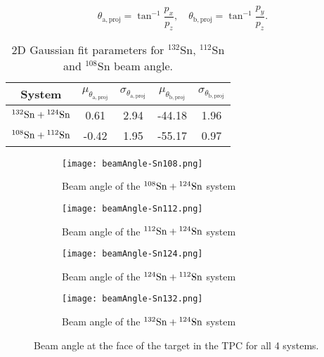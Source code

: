 
\begin{equation}
  \theta_\mathrm{a,proj}=\tan^{-1}\frac{p_x}{p_z},\quad
  \theta_\mathrm{b,proj}=\tan^{-1}\frac{p_y}{p_z}.
  \label{beamAngle}
\end{equation}





\begin{table}[!htb]
  \begin{center}
    \begin{tabular}{ccccc}
      \hline 
      System & $\mu_{\theta_\mathrm{a,proj}}$ &
      $\sigma_{\theta_\mathrm{a,proj}}$ & $\mu_{\theta_\mathrm{b,proj}}$ &
      $\sigma_{\theta_\mathrm{b,proj}}$ \\
      \hline\hline 
      ${}^{132}\mathrm{Sn} + {}^{124}\mathrm{Sn}$ & 0.61 & 2.94 & -44.18 & 1.96 \\
      ${}^{108}\mathrm{Sn} + {}^{112}\mathrm{Sn}$ & -0.42 & 1.95 & -55.17 & 0.97 \\
      \hline
    \end{tabular}
    \caption{2D Gaussian fit parameters for $^{132}$Sn, $^{112}$Sn and
      $^{108}$Sn beam angle. \label{beamAngleParameters}}
  \end{center}
\end{table}

\begin{figure}[!htb]
    \centering
    \begin{subfigure}[t]{0.45\textwidth}
        \centering
        \texttt{[image: beamAngle-Sn108.png]} 
        \caption{Beam angle of the ${}^{108}\mathrm{Sn} + {}^{124}\mathrm{Sn}$ system} \label{fig:beamangle108}
    \end{subfigure}
    \hfill
    \begin{subfigure}[t]{0.45\textwidth}
        \centering
        \texttt{[image: beamAngle-Sn112.png]} 
        \caption{Beam angle of the ${}^{112}\mathrm{Sn} + {}^{124}\mathrm{Sn}$ system} \label{fig:beamangle112}
    \end{subfigure}
    
    \begin{subfigure}[t]{0.45\textwidth}
        \centering
        \texttt{[image: beamAngle-Sn124.png]} 
        \caption{Beam angle of the ${}^{124}\mathrm{Sn} + {}^{112}\mathrm{Sn}$ system} \label{fig:beamangle124}
    \end{subfigure}
    \hfill
    \begin{subfigure}[t]{0.45\textwidth}
        \centering
        \texttt{[image: beamAngle-Sn132.png]} 
        \caption{Beam angle of the ${}^{132}\mathrm{Sn} + {}^{124}\mathrm{Sn}$ system} \label{fig:beamangle132}
    \end{subfigure}
\caption{Beam angle at the face of the target in the TPC for all 4 systems.}
\label{fig:beamangle}
\end{figure}


